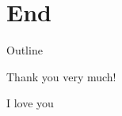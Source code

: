 \documentclass[english,svgnames,notes=hide,aspectratio=169,14pt]{beamer}
\begin{document}

\section{End}


\begin{frame}{Outline}

   \tableofcontents[currentsection]

\end{frame}


\begin{frame}{Thank you very much!}

   \centering

   I love you \color{red} \faHeart

\end{frame}


\end{document}
